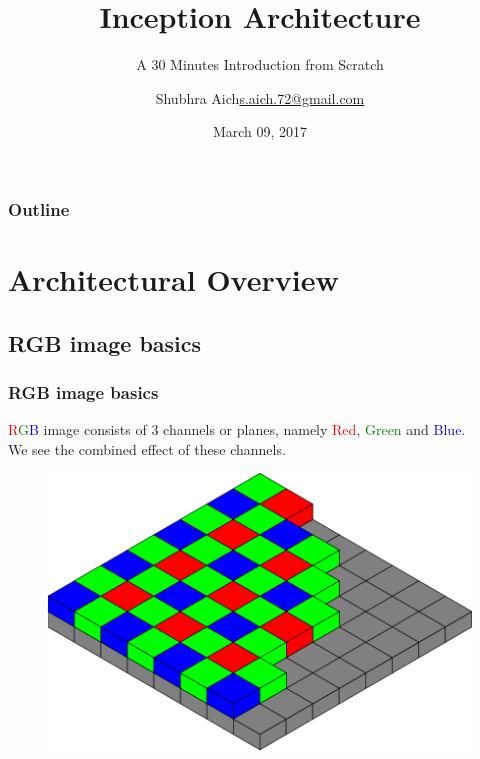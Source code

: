 \documentclass{beamer}
\title[Short Paper Title]{Inception Architecture}
\subtitle{A 30 Minutes Introduction from Scratch}
\institute{}
\author{\texorpdfstring{Shubhra Aich\newline\url{s.aich.72@gmail.com}}{Shubhra Aich}}
\date{March 09, 2017}
\begin{document}
\begin{frame}
  \titlepage
\end{frame}

\begin{frame}
  \frametitle{Outline}
  \tableofcontents
\end{frame}

\section{Architectural Overview}

\subsection{RGB image basics}
\begin{frame}
	\frametitle{RGB image basics}
	\begin{minipage}{0.45\textwidth}	 		
	\textcolor{red}{R}\textcolor{green}{G}\textcolor{blue}{B} image consists of 3 channels or planes, namely \textcolor{red}{Red}, \textcolor{green}{Green} and \textcolor{blue}{Blue}. \\
	We see the combined effect of these channels.
	\end{minipage}	
	\begin{minipage}{0.45\textwidth}
		\hspace{1em}	
		\begin{figure}
	\includegraphics[scale=0.12]{./figures/edit/bayer_sensor.png} 				
	\end{figure}
			

\end{minipage}
\end{frame}
\end{document}
